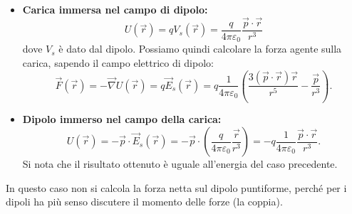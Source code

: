 \documentclass{book}
\begin{document}
\begin{itemize}
    \item \textbf{Carica immersa nel campo di dipolo:}\\
    \[
    U(\vec{r})=qV_s(\vec{r})
    = \frac{q}{4\pi\varepsilon_0} \frac{\vec{p} \cdot \vec{r}}{r^3}
    \]
    dove $V_s$ è dato dal dipolo. Possiamo quindi calcolare la forza agente sulla carica, sapendo il campo elettrico di dipolo:
    \[
    \vec{F}(\vec{r})= -\vec{\nabla}U(\vec{r})= q \vec{E}_s(\vec{r})
    = q \frac{1}{4\pi\varepsilon_0} \left( \frac{3(\vec{p}\cdot\vec{r})\vec{r}}{r^5}-\frac{\vec{p}}{r^3}\right).
    \]
    \item \textbf{Dipolo immerso nel campo della carica:}\\
    \[
    U (\vec{r}) = -\vec{p}\cdot\vec{E}_s(\vec{r}) = -\vec{p}\cdot\left(\frac{q}{4\pi\varepsilon_0}\frac{\vec{r}}{r^3}\right)
    = -q \frac{1}{4\pi\varepsilon_0}\frac{\vec{p}\cdot\vec{r}}{r^3}.
    \]
    Si nota che il risultato ottenuto è uguale all'energia del caso precedente.
\end{itemize}
In questo caso non si calcola la forza netta sul dipolo puntiforme, perché per i dipoli ha più senso discutere il momento delle forze (la coppia).
\end{document}
